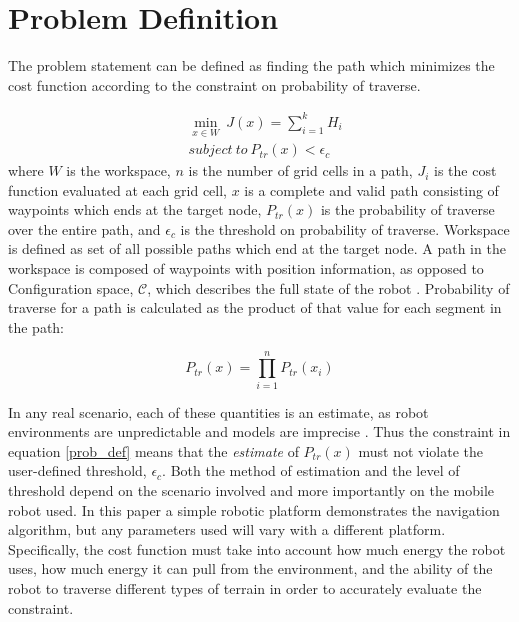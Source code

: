 \documentclass[journal]{IEEEtran}
\begin{document}
\section{Problem Definition}
The problem statement can be defined as finding the path which minimizes the cost function according to the constraint on probability of traverse.

\begin{align}
\label{prob_def}
&\min_{x\in W}\ J(x) = \sum_{i=1}^{k} H_i \\
&subject\ to\  P_{tr}(x)<\epsilon_c
\end{align}
where $W$ is the workspace, $n$ is the number of grid cells in a path, $J_i$ is the cost function evaluated at each grid cell, $x$ is a complete and valid path consisting of waypoints which ends at the target node, $P_{tr}(x)$ is the probability of traverse over the entire path, and $\epsilon_c$ is the threshold on probability of traverse. 
Workspace is defined as set of all possible paths which end at the target node. A path in the workspace is composed of waypoints with position information, as opposed to Configuration space, $\mathcal{C}$, which describes the full state of the robot \cite{LaValle - Motion Planning}. Probability of traverse for a path is calculated as the product of that value for each segment in the path:


\begin{equation}
\label{Ptr}
P_{tr}(x) = \prod_{i=1}^n P_{tr}(x_i)
\end{equation}

In any real scenario, each of these quantities is an estimate, as robot environments are unpredictable and models are imprecise \cite{thrun2005probabilistic}. 
Thus the constraint in equation \ref{prob_def} means that the \textit{estimate} of $P_{tr}(x)$ must not violate the user-defined threshold, $\epsilon_c$. 
Both the method of estimation and the level of threshold depend on the scenario involved and more importantly on the mobile robot used. 
In this paper a simple robotic platform demonstrates the navigation algorithm, but any parameters used will vary with a different platform. 
Specifically, the cost function must take into account how much energy the robot uses, how much energy it can pull from the environment, and the ability of the robot to traverse different types of terrain in order to accurately evaluate the constraint.
\end{document}
